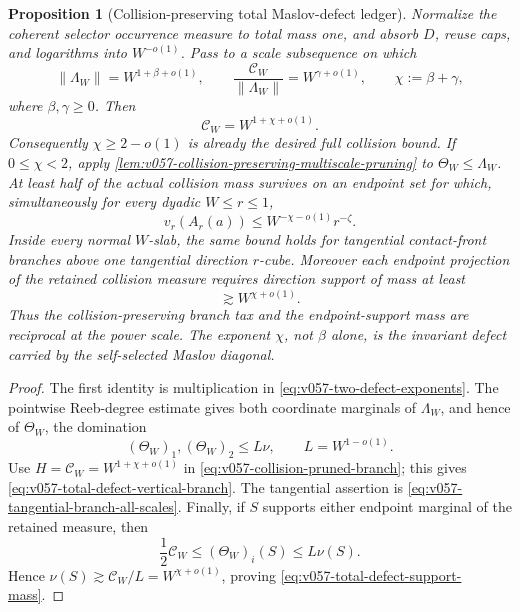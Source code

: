 \documentclass[10pt]{article}
\newtheorem{proposition}[theorem]{Proposition}
\begin{document}
\begin{proposition}[Collision-preserving total Maslov-defect ledger]
\label{prop:v057-total-maslov-defect-ledger}
Normalize the coherent selector occurrence measure to total mass one, and absorb \(D\), reuse
caps, and logarithms into \(W^{-o(1)}\).  Pass to a scale subsequence on which
\begin{equation}
\label{eq:v057-two-defect-exponents}
\|\Lambda_W\|
=
W^{1+\beta+o(1)},
\qquad
\frac{\mathcal C_W}{\|\Lambda_W\|}
=
W^{\gamma+o(1)},
\qquad
\chi:=\beta+\gamma,
\end{equation}
where \(\beta,\gamma\ge0\).  Then
\begin{equation}
\label{eq:v057-full-collision-total-defect}
\boxed{
\mathcal C_W
=
W^{1+\chi+o(1)}.
}
\end{equation}
Consequently \(\chi\ge2-o(1)\) is already the desired full collision bound.  If
\(0\le\chi<2\), apply
\cref{lem:v057-collision-preserving-multiscale-pruning} to
\(\Theta_W\le\Lambda_W\).  At least half of the actual collision mass survives on an endpoint set
for which, simultaneously for every dyadic \(W\le r\le1\),
\begin{equation}
\label{eq:v057-total-defect-vertical-branch}
\boxed{
v_r(A_r(a))
\le
W^{-\chi-o(1)}r^{-\zeta}.
}
\end{equation}
Inside every normal \(W\)-slab, the same bound holds for tangential contact-front branches above
one tangential direction \(r\)-cube.  Moreover each endpoint projection of the retained collision
measure requires direction support of mass at least
\begin{equation}
\label{eq:v057-total-defect-support-mass}
\boxed{
\gtrsim
W^{\chi+o(1)}.
}
\end{equation}
Thus the collision-preserving branch tax and the endpoint-support mass are reciprocal at the power
scale.  The exponent \(\chi\), not \(\beta\) alone, is the invariant defect carried by the
self-selected Maslov diagonal.
\end{proposition}

\begin{proof}
The first identity is multiplication in
\eqref{eq:v057-two-defect-exponents}.  The pointwise Reeb-degree estimate gives both coordinate
marginals of \(\Lambda_W\), and hence of \(\Theta_W\), the domination
\[
(\Theta_W)_1,(\Theta_W)_2
\le
L\nu,
\qquad
L=W^{1-o(1)}.
\]
Use \(H=\mathcal C_W=W^{1+\chi+o(1)}\) in
\eqref{eq:v057-collision-pruned-branch}; this gives
\eqref{eq:v057-total-defect-vertical-branch}.  The tangential assertion is
\eqref{eq:v057-tangential-branch-all-scales}.  Finally, if \(S\) supports either endpoint marginal
of the retained measure, then
\[
\frac12\mathcal C_W
\le
(\Theta_W)_i(S)
\le
L\nu(S).
\]
Hence \(\nu(S)\gtrsim\mathcal C_W/L=W^{\chi+o(1)}\), proving
\eqref{eq:v057-total-defect-support-mass}.
\end{proof}
\end{document}
